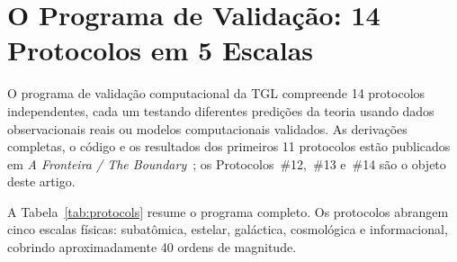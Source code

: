 \documentclass[12pt,a4paper,twocolumn]{article}
\begin{document}
\section{O Programa de Validação: 14 Protocolos em 5 Escalas}
\label{sec:protocols}

O programa de validação computacional da TGL compreende 14 protocolos independentes, cada um testando diferentes predições da teoria usando dados observacionais reais ou modelos computacionais validados. As derivações completas, o código e os resultados dos primeiros 11 protocolos estão publicados em \textit{A Fronteira / The Boundary}~\cite{Miguel2026Fronteira}; os Protocolos~\#12,~\#13 e~\#14 são o objeto deste artigo.

A Tabela~\ref{tab:protocols} resume o programa completo. Os protocolos abrangem cinco escalas físicas: subatômica, estelar, galáctica, cosmológica e informacional, cobrindo aproximadamente 40 ordens de magnitude.
\end{document}
